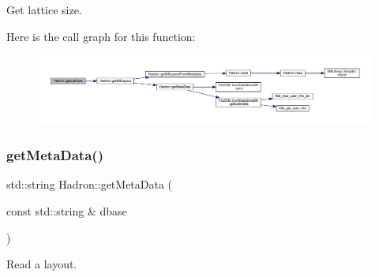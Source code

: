 Get lattice size. 

Here is the call graph for this function\+:
\nopagebreak
\begin{figure}[H]
\begin{center}
\leavevmode
\includegraphics[width=350pt]{d1/daf/namespaceHadron_aa639c858514f322eb7ee4c074924746a_cgraph}
\end{center}
\end{figure}
\mbox{\label{namespaceHadron_a6c9f3d44d269357faf4d786cc73ec742}} 
\subsubsection{\texorpdfstring{getMetaData()}{getMetaData()}}
{\footnotesize\ttfamily std\+::string Hadron\+::get\+Meta\+Data (\begin{DoxyParamCaption}\item[{const std\+::string \&}]{dbase }\end{DoxyParamCaption})}



Read a layout. 

